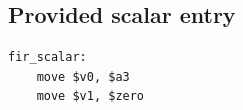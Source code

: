 \subsection{Provided scalar entry}
\begin{verbatim}
fir_scalar:
    move $v0, $a3
    move $v1, $zero
\end{verbatim}
